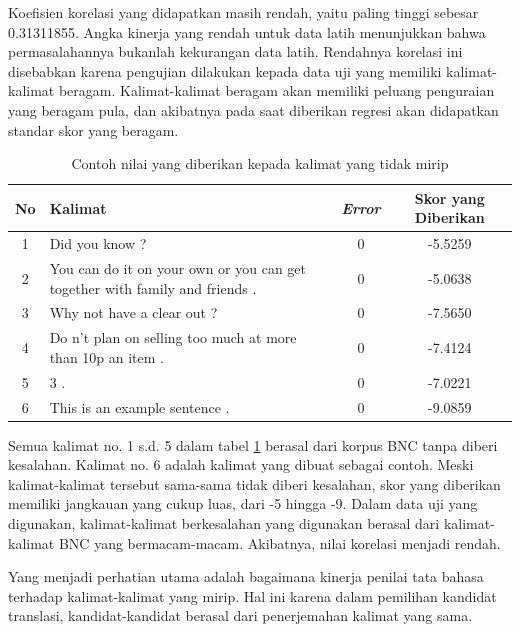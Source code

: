\documentclass[conference]{IEEEtran}
\begin{document}
Koefisien korelasi yang didapatkan masih rendah, yaitu paling tinggi sebesar 0.31311855. Angka kinerja yang rendah untuk data latih menunjukkan bahwa permasalahannya bukanlah kekurangan data latih. Rendahnya korelasi ini disebabkan karena pengujian dilakukan kepada data uji yang memiliki kalimat-kalimat beragam. Kalimat-kalimat beragam akan memiliki peluang penguraian yang beragam pula, dan akibatnya pada saat diberikan regresi akan didapatkan standar skor yang beragam.

\begin{table}[h]
\caption{Contoh nilai yang diberikan kepada kalimat yang tidak mirip}
\begin{center}
\begin{tabular}{|c|p{3.5cm}|c|c|}
\hline
\textbf{No}&\textbf{Kalimat}&\textbf{\textit{Error}}&\textbf{Skor yang Diberikan}\\
\hline
1&Did you know ?&0&-5.5259\\
\hline
2&You can do it on your own or you can get together with family and friends . &0&-5.0638\\
\hline
3&Why not have a clear out ?&0&-7.5650\\
\hline
4&Do n't plan on selling too much at more than 10p an item .&0&-7.4124\\
\hline
5&3 .&0&-7.0221\\
\hline
6&This is an example sentence .&0&-9.0859\\
\hline

\end{tabular}
\label{tabeksperimenscoringnotsimilarexample}
\end{center}
\end{table}

Semua kalimat no. 1 s.d. 5 dalam tabel \ref{tabeksperimenscoringnotsimilarexample} berasal dari korpus BNC tanpa diberi kesalahan. Kalimat no. 6 adalah kalimat yang dibuat sebagai contoh. Meski kalimat-kalimat tersebut sama-sama tidak diberi kesalahan, skor yang diberikan memiliki jangkauan yang cukup luas, dari -5 hingga -9. Dalam data uji yang digunakan, kalimat-kalimat berkesalahan yang digunakan berasal dari kalimat-kalimat BNC yang bermacam-macam. Akibatnya, nilai korelasi menjadi rendah.

Yang menjadi perhatian utama adalah bagaimana kinerja penilai tata bahasa terhadap kalimat-kalimat yang mirip. Hal ini karena dalam pemilihan kandidat translasi, kandidat-kandidat berasal dari penerjemahan kalimat yang sama.
\end{document}
